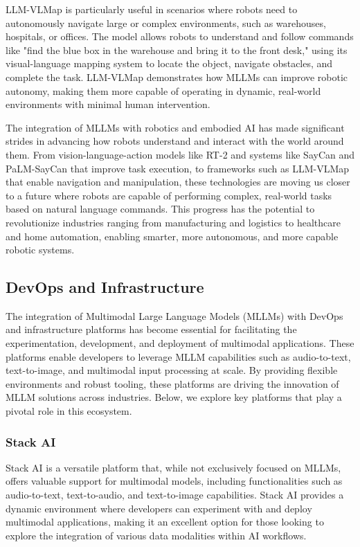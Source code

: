 LLM-VLMap is particularly useful in scenarios where robots need to autonomously navigate large or complex environments, such as warehouses, hospitals, or offices. 
The model allows robots to understand and follow commands like "find the blue box in the warehouse and bring it to the front desk," using its visual-language mapping system to locate the object, navigate obstacles, and complete the task. 
LLM-VLMap demonstrates how MLLMs can improve robotic autonomy, making them more capable of operating in dynamic, real-world environments with minimal human intervention.

The integration of MLLMs with robotics and embodied AI has made significant strides in advancing how robots understand and interact with the world around them. 
From vision-language-action models like RT-2 and systems like SayCan and PaLM-SayCan that improve task execution, to frameworks such as LLM-VLMap that enable navigation and manipulation, these technologies are moving us closer to a future where robots are capable of performing complex, real-world tasks based on natural language commands. 
This progress has the potential to revolutionize industries ranging from manufacturing and logistics to healthcare and home automation, enabling smarter, more autonomous, and more capable robotic systems.

\subsection{DevOps and Infrastructure}

The integration of Multimodal Large Language Models (MLLMs) with DevOps and infrastructure platforms has become essential for facilitating the experimentation, development, and deployment of multimodal applications. 
These platforms enable developers to leverage MLLM capabilities such as audio-to-text, text-to-image, and multimodal input processing at scale. 
By providing flexible environments and robust tooling, these platforms are driving the innovation of MLLM solutions across industries. 
Below, we explore key platforms that play a pivotal role in this ecosystem.

\subsubsection{Stack AI}

Stack AI is a versatile platform that, while not exclusively focused on MLLMs, offers valuable support for multimodal models, including functionalities such as audio-to-text, text-to-audio, and text-to-image capabilities. 
Stack AI provides a dynamic environment where developers can experiment with and deploy multimodal applications, making it an excellent option for those looking to explore the integration of various data modalities within AI workflows.

